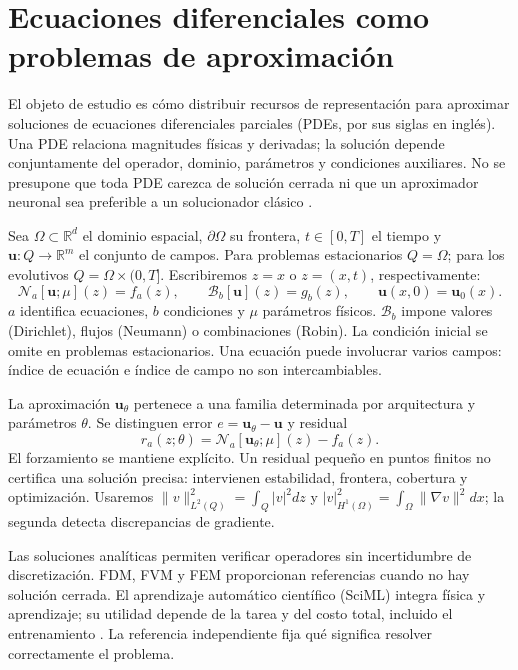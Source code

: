 \label{sec:marco-teorico}
\section{Ecuaciones diferenciales como problemas de aproximación}
El objeto de estudio es cómo distribuir recursos de representación para aproximar soluciones de ecuaciones diferenciales parciales (PDEs, por sus siglas en inglés). Una PDE relaciona magnitudes físicas y derivadas; la solución depende conjuntamente del operador, dominio, parámetros y condiciones auxiliares. No se presupone que toda PDE carezca de solución cerrada ni que un aproximador neuronal sea preferible a un solucionador clásico \cite{evans1998pde,raissi2019,grossmann2024}.

Sea $\Omega\subset\mathbb R^d$ el dominio espacial, $\partial\Omega$ su frontera, $t\in[0,T]$ el tiempo y $\mathbf u:Q\to\mathbb R^m$ el conjunto de campos. Para problemas estacionarios $Q=\Omega$; para los evolutivos $Q=\Omega\times(0,T]$. Escribiremos $z=x$ o $z=(x,t)$, respectivamente:
\begin{equation}
\mathcal N_a[\mathbf u;\mu](z)=f_a(z),\qquad \mathcal B_b[\mathbf u](z)=g_b(z),\qquad \mathbf u(x,0)=\mathbf u_0(x).
\label{eq:pde-general}
\end{equation}
$a$ identifica ecuaciones, $b$ condiciones y $\mu$ parámetros físicos. $\mathcal B_b$ impone valores (Dirichlet), flujos (Neumann) o combinaciones (Robin). La condición inicial se omite en problemas estacionarios. Una ecuación puede involucrar varios campos: índice de ecuación e índice de campo no son intercambiables.

La aproximación $\mathbf u_\theta$ pertenece a una familia determinada por arquitectura y parámetros $\theta$. Se distinguen error $e=\mathbf u_\theta-\mathbf u$ y residual
\begin{equation}
r_a(z;\theta)=\mathcal N_a[\mathbf u_\theta;\mu](z)-f_a(z).
\label{eq:residual}
\end{equation}
El forzamiento se mantiene explícito. Un residual pequeño en puntos finitos no certifica una solución precisa: intervienen estabilidad, frontera, cobertura y optimización. Usaremos $\|v\|_{L^2(Q)}^2=\int_Q|v|^2dz$ y $|v|_{H^1(\Omega)}^2=\int_\Omega\|\nabla v\|^2dx$; la segunda detecta discrepancias de gradiente.

Las soluciones analíticas permiten verificar operadores sin incertidumbre de discretización. FDM, FVM y FEM proporcionan referencias cuando no hay solución cerrada. El aprendizaje automático científico (SciML) integra física y aprendizaje; su utilidad depende de la tarea y del costo total, incluido el entrenamiento \cite{karniadakis2021,grossmann2024}. La referencia independiente fija qué significa resolver correctamente el problema.

